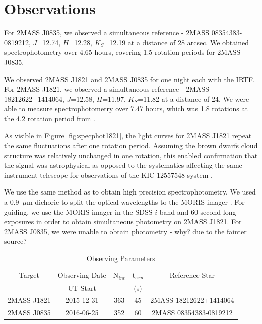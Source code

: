\documentclass[twocolumn]{aastex6}
\begin{document}
\section{Observations}

For 2MASS J0835, we observed a simultaneous reference - 2MASS 08354383-0819212, $J$=12.74, $H$=12.28, $K_S$=12.19 at a distance of 28 arcsec.
We obtained spectrophotometry over 4.65 hours, covering 1.5 rotation periods for 2MASS J0835.

We observed 2MASS J1821 and 2MASS J0835 for one night each with the IRTF.
For 2MASS J1821, we observed a simultaneous reference - 2MASS 18212622+1414064, $J$=12.58, $H$=11.97, $K_S$=11.82  at a distance of 24\arcsec.
We were able to measure spectrophotometry over 7.47 hours, which was 1.8 rotations at the 4.2 rotation period from \citet{metchev2015weatherII}.

As visible in Figure \ref{fig:specphot1821}, the light curves for 2MASS J1821 repeat the same fluctuations after one rotation period.
Assuming the brown dwarfs cloud structure was relatively unchanged in one rotation, this enabled confirmation that the signal was astrophysical as opposed to the systematics affecting the same instrument telescope for observations of the  KIC 12557548 system \citep{schlawin2016kic1255}.



We use the same method as \citet{schlawin2014} to obtain high precision spectrophotometry.
We used a 0.9~$\mu$m dichoric to split the optical wavelengths to the MORIS imager \citep{Gulbis2011}.
For guiding, we use the MORIS imager in the SDSS $i$ band and 60 second long exposures in order to obtain simultaneous photometry on 2MASS J1821.
For 2MASS J0835, we were unable to obtain photometry - why? due to the fainter source?

\begin{table}
\begin{center}
\caption{Observing Parameters}\label{tab:obsParam}
\begin{tabular}{ccccc}
Target & Observing Date & N$_{int}$ & t$_{exp}$ & Reference Star \\
-- & UT Start & -- & (s) & -- \\
\hline
2MASS J1821 & 2015-12-31 & 363 & 45 & 2MASS 18212622+1414064 \\
2MASS J0835 & 2016-06-25 & 352 & 60 & 2MASS 08354383-0819212 \\
\end{tabular}
\end{center}
\tablenotetext{}{}
\end{table}
\end{document}
